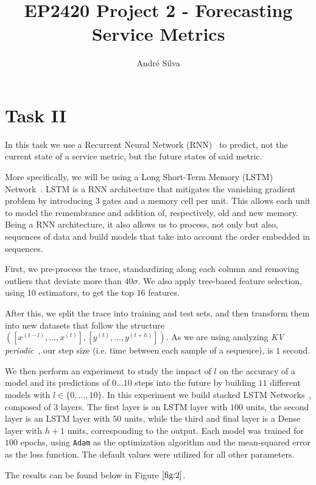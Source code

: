 \documentclass[10pt]{article}
\title{EP2420 Project 2 - Forecasting Service Metrics}
\author{André Silva}
\begin{document}
\maketitle

\section*{Task II}
\label{sec:2}

In this task we use a Recurrent Neural Network (RNN)~\cite{RNN} to predict, not the current state of a service metric, but the future states of said metric. 

More specifically, we will be using a Long Short-Term Memory (LSTM) Network~\cite{LSTM}.
LSTM is a RNN architecture that mitigates the vanishing gradient problem by introducing $3$ gates and a memory cell per unit. This allows each unit to model the remembrance and addition of, respectively, old and new memory. Being a RNN architecture, it also allows us to process, not only but also, sequences of data and build models that take into account the order embedded in sequences.

First, we pre-process the trace, standardizing along each column and removing outliers that deviate more than $40\sigma$. We also apply tree-based feature selection, using 10 estimators, to get the top $16$ features.

After this, we split the trace into training and test sets, and then transform them into new datasets that follow the structure $([x^{(t-l)},...,x^{(t)}],[y^{(t)},...,y^{(t+h)}])$. As we are using analyzing \textit{KV periodic}~\cite{9012741}, our step size (i.e. time between each sample of a sequence), is $1$ second.

We then perform an experiment to study the impact of $l$ on the accuracy of a model and its predictions of $0...10$ steps into the future by building $11$ different models with $l\in\{0,...,10\}$. In this experiment we build stacked LSTM Networks~\cite{SLSTM}, composed of 3 layers. The first layer is an LSTM layer with $100$ units, the second layer is an LSTM layer with $50$ units, while the third and final layer is a Dense layer with $h+1$ units, corresponding to the output. Each model was trained for $100$ epochs, using \texttt{Adam} as the optimization algorithm and the mean-squared error as the loss function. The default values were utilized for all other parameters.

The results can be found below in Figure $\ref{fig:2}$.
\end{document}
